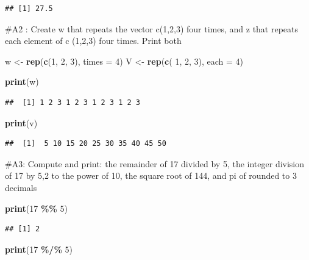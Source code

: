 \documentclass[
]{article}
\newenvironment{Shaded}{\begin{snugshade}}{\end{snugshade}}
\newcommand{\AttributeTok}[1]{\textcolor[rgb]{0.13,0.29,0.53}{#1}}
\newcommand{\DecValTok}[1]{\textcolor[rgb]{0.00,0.00,0.81}{#1}}
\newcommand{\FunctionTok}[1]{\textcolor[rgb]{0.13,0.29,0.53}{\textbf{#1}}}
\newcommand{\NormalTok}[1]{#1}
\newcommand{\OtherTok}[1]{\textcolor[rgb]{0.56,0.35,0.01}{#1}}
\newcommand{\SpecialCharTok}[1]{\textcolor[rgb]{0.81,0.36,0.00}{\textbf{#1}}}
\begin{document}
\begin{verbatim}
## [1] 27.5
\end{verbatim}

\#A2 : Create w that repeats the vector c(1,2,3) four times, and z that
repeats each element of c (1,2,3) four times. Print both

\begin{Shaded}
\begin{Highlighting}[]
\NormalTok{w }\OtherTok{\textless{}{-}} \FunctionTok{rep}\NormalTok{(}\FunctionTok{c}\NormalTok{(}\DecValTok{1}\NormalTok{, }\DecValTok{2}\NormalTok{, }\DecValTok{3}\NormalTok{), }\AttributeTok{times =} \DecValTok{4}\NormalTok{)}
\NormalTok{V }\OtherTok{\textless{}{-}} \FunctionTok{rep}\NormalTok{(}\FunctionTok{c}\NormalTok{( }\DecValTok{1}\NormalTok{, }\DecValTok{2}\NormalTok{, }\DecValTok{3}\NormalTok{), }\AttributeTok{each =} \DecValTok{4}\NormalTok{)}

\FunctionTok{print}\NormalTok{(w)}
\end{Highlighting}
\end{Shaded}

\begin{verbatim}
##  [1] 1 2 3 1 2 3 1 2 3 1 2 3
\end{verbatim}

\begin{Shaded}
\begin{Highlighting}[]
\FunctionTok{print}\NormalTok{(v)}
\end{Highlighting}
\end{Shaded}

\begin{verbatim}
##  [1]  5 10 15 20 25 30 35 40 45 50
\end{verbatim}

\#A3: Compute and print: the remainder of 17 divided by 5, the integer
division of 17 by 5,2 to the power of 10, the square root of 144, and pi
of rounded to 3 decimals

\begin{Shaded}
\begin{Highlighting}[]
\FunctionTok{print}\NormalTok{(}\DecValTok{17} \SpecialCharTok{\%\%} \DecValTok{5}\NormalTok{)}
\end{Highlighting}
\end{Shaded}

\begin{verbatim}
## [1] 2
\end{verbatim}

\begin{Shaded}
\begin{Highlighting}[]
\FunctionTok{print}\NormalTok{(}\DecValTok{17} \SpecialCharTok{\%/\%} \DecValTok{5}\NormalTok{)}
\end{Highlighting}
\end{Shaded}
\end{document}
